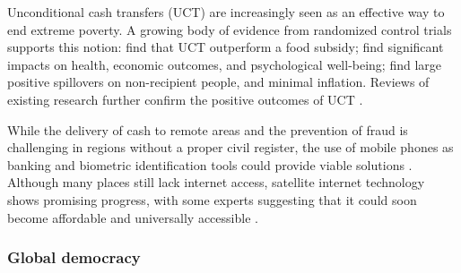 \documentclass[12pt,english]{article}
\begin{document}
Unconditional cash transfers (UCT) are increasingly seen as an effective way to end extreme poverty. A growing body of evidence from randomized control trials supports this notion: \citet{gangopadhyay_cash_2015} find that UCT outperform a food subsidy; \citet{haushofer_short-term_2016} find significant impacts on health, economic outcomes, and psychological well-being; \citet{egger_general_2022} find large positive spillovers on non-recipient people, and minimal inflation. 
Reviews of existing research further confirm the positive outcomes of UCT \citep{standing_little_2014,bastagli_cash_2016}. %

While the delivery of cash to remote areas and the prevention of fraud is challenging in regions without a proper civil register, the use of mobile phones as banking and biometric identification tools could provide viable solutions \citep{harnett_taking_2017}. Although many places still lack internet access, satellite internet technology shows promising progress, with some experts suggesting that it could soon become affordable and universally accessible \citep{hanson_satellite_2016}.

\subsubsection{Global democracy}\label{subsubsec:literature_democracy}
\end{document}
